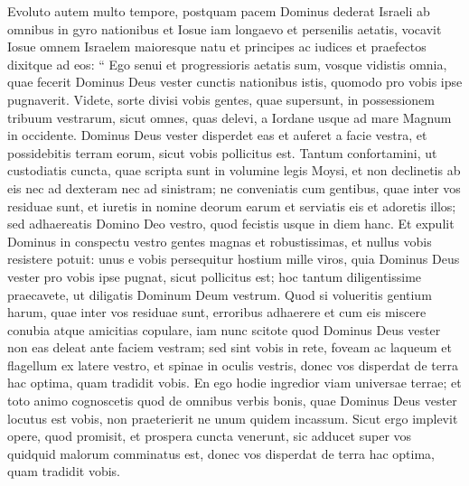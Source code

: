 \begin{biblechapter}
\begin{biblechapter}
\begin{biblechapter}
\begin{biblechapter}
\begin{biblechapter}
\begin{biblechapter}
\begin{biblechapter}
\begin{biblechapter}
\begin{biblechapter}
\begin{biblechapter}
\begin{biblechapter}
\begin{biblechapter}
\begin{biblechapter}
\begin{biblechapter}
\begin{biblechapter}
\begin{biblechapter}
\begin{biblechapter}
\begin{biblechapter}
\begin{biblechapter}
\begin{biblechapter}
\begin{biblechapter}
\begin{biblechapter}
\begin{biblechapter}
\verse Evoluto autem multo tempore, postquam pacem Dominus dederat Israeli ab omnibus in gyro nationibus et Iosue iam longaevo et persenilis aetatis, 
\verse vocavit Iosue omnem Israelem maioresque natu et principes ac iudices et praefectos dixitque ad eos: “ Ego senui et progressioris aetatis sum, 
\verse vosque vidistis omnia, quae fecerit Dominus Deus vester cunctis nationibus istis, quomodo pro vobis ipse pugnaverit. 
\verse Videte, sorte divisi vobis gentes, quae supersunt, in possessionem tribuum vestrarum, sicut omnes, quas delevi, a Iordane usque ad mare Magnum in occidente. 
\verse Dominus Deus vester disperdet eas et auferet a facie vestra, et possidebitis terram eorum, sicut vobis pollicitus est. 
\verse Tantum confortamini, ut custodiatis cuncta, quae scripta sunt in volumine legis Moysi, et non declinetis ab eis nec ad dexteram nec ad sinistram; 
\verse ne conveniatis cum gentibus, quae inter vos residuae sunt, et iuretis in nomine deorum earum et serviatis eis et adoretis illos; 
 \verse sed adhaereatis Domino Deo vestro, quod fecistis usque in diem hanc. 
\verse Et expulit Dominus in conspectu vestro gentes magnas et robustissimas, et nullus vobis resistere potuit: 
\verse unus e vobis persequitur hostium mille viros, quia Dominus Deus vester pro vobis ipse pugnat, sicut pollicitus est; 
\verse hoc tantum diligentissime praecavete, ut diligatis Dominum Deum vestrum. 
\verse Quod si volueritis gentium harum, quae inter vos residuae sunt, erroribus adhaerere et cum eis miscere conubia atque amicitias copulare, 
\verse iam nunc scitote quod Dominus Deus vester non eas deleat ante faciem vestram; sed sint vobis in rete, foveam ac laqueum et flagellum ex latere vestro, et spinae in oculis vestris, donec vos disperdat de terra hac optima, quam tradidit vobis.
 \verse En ego hodie ingredior viam universae terrae; et toto animo cognoscetis quod de omnibus verbis bonis, quae Dominus Deus vester locutus est vobis, non praeterierit ne unum quidem incassum. 
\verse Sicut ergo implevit opere, quod promisit, et prospera cuncta venerunt, sic adducet super vos quidquid malorum comminatus est, donec vos disperdat de terra hac optima, quam tradidit vobis. 

\end{biblechapter}
\end{biblechapter}
\end{biblechapter}
\end{biblechapter}
\end{biblechapter}
\end{biblechapter}
\end{biblechapter}
\end{biblechapter}
\end{biblechapter}
\end{biblechapter}
\end{biblechapter}
\end{biblechapter}
\end{biblechapter}
\end{biblechapter}
\end{biblechapter}
\end{biblechapter}
\end{biblechapter}
\end{biblechapter}
\end{biblechapter}
\end{biblechapter}
\end{biblechapter}
\end{biblechapter}
\end{biblechapter}
